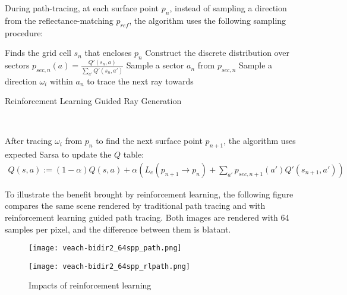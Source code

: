 During path-tracing, at each surface point $p_n$, instead of sampling a direction from the reflectance-matching $p_{ref}$, the algorithm uses the following sampling procedure:

\begin{algorithm}[H]
    \label{algo sample from Q}
    Finds the grid cell $s_n$ that encloses $p_n$\;
    Construct the discrete distribution over sectors $p_{sec,n}(a)=\frac{Q'(s_n,a)}{\sum_{a'}Q'(s_n,a')}$\;
    Sample a sector $a_n$ from $p_{sec,n}$\;
    Sample a direction $\omega_i$ within $a_n$ to trace the next ray towards\;
    \caption{Reinforcement Learning Guided Ray Generation}
\end{algorithm} 

~

After tracing $\omega_i$ from $p_n$ to find the next surface point $p_{n+1}$, the algorithm uses expected Sarsa to update the $Q$ table:
\begin{align*}
    Q(s,a) := (1-\alpha) Q(s,a) + \alpha  \left(L_e(p_{n+1}\to p_n)+ \sum_{a'} p_{sec,n+1}(a')  Q'(s_{n+1},a')\right)
\end{align*}

To illustrate the benefit brought by reinforcement learning, the following figure compares the same scene rendered by traditional path tracing and with reinforcement learning guided path tracing. Both images are rendered with 64 samples per pixel, and the difference between them is blatant. 

\begin{figure}[H]
    \centering
    
    \begin{minipage}[t]{.99\textwidth}
        \centering
        \vspace{0pt}
        \texttt{[image: veach-bidir2\_64spp\_path.png]}
    \end{minipage}
    
    \vspace{0.3cm}

    \begin{minipage}[t]{.99\textwidth}
        \centering
        \vspace{0pt}
        \texttt{[image: veach-bidir2\_64spp\_rlpath.png]}
    \end{minipage}
    
    \caption{Impacts of reinforcement learning}
    \label{fig RL comparison}
\end{figure}
